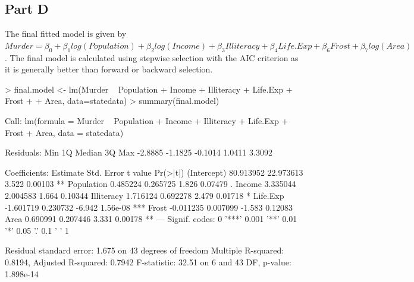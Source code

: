 \documentclass{article}
\begin{document}
\subsection{Part D}
The final fitted model is given by $Murder = \beta_0 + \beta_1log(Population) + \beta_2log(Income) + \beta_3Illiteracy + \beta_4Life.Exp + \beta_6Frost + \beta_7log(Area)$. The final model is calculated using stepwise selection with the AIC criterion as it is generally better than forward or backward selection.
\begin{Schunk}
\begin{Sinput}
> final.model <- lm(Murder ~ Population + Income + Illiteracy + Life.Exp + Frost + 
+      Area, data=statedata)
> summary(final.model)
\end{Sinput}
\begin{Soutput}
Call:
lm(formula = Murder ~ Population + Income + Illiteracy + Life.Exp + 
    Frost + Area, data = statedata)

Residuals:
    Min      1Q  Median      3Q     Max 
-2.8885 -1.1825 -0.1014  1.0411  3.3092 

Coefficients:
             Estimate Std. Error t value Pr(>|t|)    
(Intercept) 80.913952  22.973613   3.522  0.00103 ** 
Population   0.485224   0.265725   1.826  0.07479 .  
Income       3.335044   2.004583   1.664  0.10344    
Illiteracy   1.716124   0.692278   2.479  0.01718 *  
Life.Exp    -1.601719   0.230732  -6.942 1.56e-08 ***
Frost       -0.011235   0.007099  -1.583  0.12083    
Area         0.690991   0.207446   3.331  0.00178 ** 
---
Signif. codes:  0 '***' 0.001 '**' 0.01 '*' 0.05 '.' 0.1 ' ' 1

Residual standard error: 1.675 on 43 degrees of freedom
Multiple R-squared:  0.8194,	Adjusted R-squared:  0.7942 
F-statistic: 32.51 on 6 and 43 DF,  p-value: 1.898e-14
\end{Soutput}
\end{Schunk}
\end{document}
